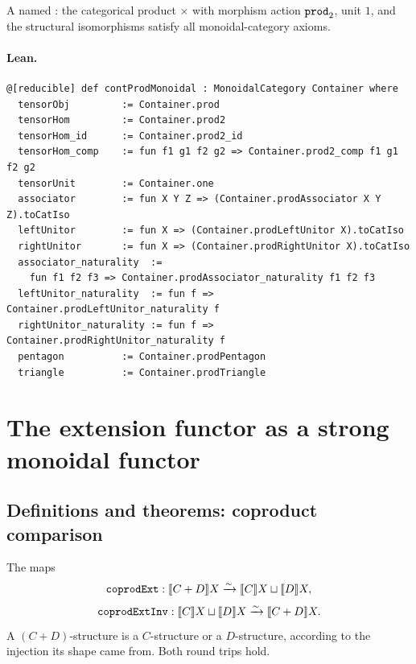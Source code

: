\documentclass[11pt,a4paper]{article}
\begin{document}
\begin{defn}
A named : the categorical product $\times$ with morphism action
$\texttt{prod}_2$, unit $1$, and the structural isomorphisms satisfy all
monoidal-category axioms.
\end{defn}

\paragraph{Lean.}
\begin{lstlisting}[style=lean]
@[reducible] def contProdMonoidal : MonoidalCategory Container where
  tensorObj         := Container.prod
  tensorHom         := Container.prod2
  tensorHom_id      := Container.prod2_id
  tensorHom_comp    := fun f1 g1 f2 g2 => Container.prod2_comp f1 g1 f2 g2
  tensorUnit        := Container.one
  associator        := fun X Y Z => (Container.prodAssociator X Y Z).toCatIso
  leftUnitor        := fun X => (Container.prodLeftUnitor X).toCatIso
  rightUnitor       := fun X => (Container.prodRightUnitor X).toCatIso
  associator_naturality  :=
    fun f1 f2 f3 => Container.prodAssociator_naturality f1 f2 f3
  leftUnitor_naturality  := fun f => Container.prodLeftUnitor_naturality f
  rightUnitor_naturality := fun f => Container.prodRightUnitor_naturality f
  pentagon          := Container.prodPentagon
  triangle          := Container.prodTriangle
\end{lstlisting}


\section{The extension functor as a strong monoidal functor}

\subsection{Definitions and theorems: coproduct comparison}

\begin{defn}
The maps
\[
  \texttt{coprodExt} : \llbracket C + D \rrbracket X \xrightarrow{\sim}
    \llbracket C \rrbracket X \sqcup \llbracket D \rrbracket X,
\]
\[
  \texttt{coprodExtInv} : \llbracket C \rrbracket X \sqcup \llbracket D \rrbracket X
    \xrightarrow{\sim} \llbracket C + D \rrbracket X.
\]
A $(C+D)$-structure is a $C$-structure or a $D$-structure, according to the
injection its shape came from.  Both round trips hold.
\end{defn}
\end{document}
